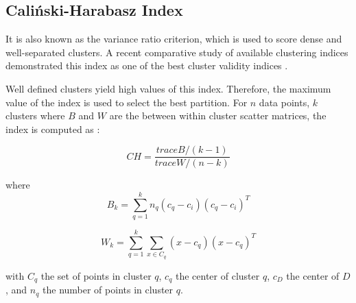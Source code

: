 \subsection{Caliński-Harabasz Index}
It is also known as the variance ratio criterion, which is used to score dense and well-separated clusters. A recent comparative study of available clustering indices demonstrated this index as one of the best cluster validity indices \cite{arbelaitz2013extensive}. 


Well defined clusters yield high values of this index. Therefore, the maximum value of the index is used to select the best partition. For \begin{math} n \end{math} data points, \begin{math} k \end{math} clusters  where \begin{math} B \end{math} and \begin{math} W \end{math} are the between within cluster scatter matrices, the index is computed as \cite{calinski1974dendrite}:


\begin{equation}
  CH =  \frac{traceB / (k - 1)} {traceW/ (n -k)}
\end{equation}   



where
\begin{equation}
    B_k = \sum_{q=1}^k n_q (c_q - c_i) (c_q - c_i)^T
\end{equation}

\begin{equation}
    W_k = \sum_{q=1}^k \sum_{x \in C_q} (x - c_q) (x - c_q)^T
\end{equation}

with $C_q$ the set of points in cluster $q$, $c_q$ the center of cluster $q$, $c_D$ the center of $D$, and $n_q$ the number of points in cluster $q$.

